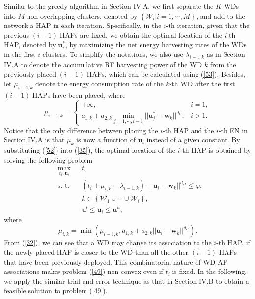\documentclass[journal, draftcls, one column, 12pt]{IEEEtran}
\begin{document}
Similar to the greedy algorithm in Section IV.A, we first separate the $K$ WDs into $M$ non-overlapping clusters, denoted by $\left\{\mathcal{W}_i| i=1,\cdots,M\right\}$, and add to the network a HAP in each iteration. Specifically, in the $i$-th iteration, given that the previous $(i-1)$ HAPs are fixed, we obtain the optimal location of the $i$-th HAP, denoted by $\mathbf{u}_i^*$, by maximizing the net energy harvesting rates of the WDs in the first $i$ clusters. To simplify the notations, we also use $\lambda_{i-1,k}$ as in Section IV.A to denote the accumulative RF harvesting power of the WD $k$ from the previously placed $(i-1)$ HAPs, which can be calculated using (\ref{53}). Besides, let $\mu_{i-1,k}$ denote the energy consumption rate of the $k$-th WD after the first $(i-1)$ HAPs have been placed, where
\begin{equation}
\label{52}
\mu_{i-1,k} = \begin{cases}
+\infty, & i=1,\\
a_{1,k} + a_{2,k} \min_{j=1,\cdots,i-1} ||\mathbf{u}_{j}^* - \mathbf{w}_k||^{d_U}, & i>1.
\end{cases}
\end{equation}
Notice that the only difference between placing the $i$-th HAP and the $i$-th EN in Section IV.A is that $\mu_k$ is now a function of $\mathbf{u}_i$ instead of a given constant. By substituting (\ref{52}) into (\ref{35}), the optimal location of the $i$-th HAP is obtained by solving the following problem
\begin{subequations}
\label{49}
   \begin{align}
    & \underset{t_i,\mathbf{u}_i}{\text{max}} & &  t_i\\
    & \text{s. t.}    & & \left(t_i + \mu_{i,k} - \lambda_{i-1,k}\right) \cdot ||\mathbf{u}_i - \mathbf{w}_k||^{d_D} \leq \varphi, \nonumber \\
    &  & & k \in \left\{\mathcal{W}_1\cup \cdots \cup \mathcal{W}_i\right\}, \label{51}\\
    & & & \mathbf{u}^l\leq \mathbf{u}_i\leq \mathbf{u}^h,
   \end{align}
\end{subequations}
where
\begin{equation}
\label{32}
\mu_{i,k} = \min\left(\mu_{i-1,k}, a_{1,k} + a_{2,k} ||\mathbf{u}_{i} - \mathbf{w}_k||^{d_U}\right).
\end{equation}
From (\ref{32}), we can see that a WD may change its association to the $i$-th HAP, if the newly placed HAP is closer to the WD than all the other $(i-1)$ HAPs that have been previously deployed. This combinatorial nature of WD-AP associations makes problem (\ref{49}) non-convex even if $t_i$ is fixed. In the following, we apply the similar trial-and-error technique as that in Section IV.B to obtain a feasible solution to problem (\ref{49}).
\end{document}
